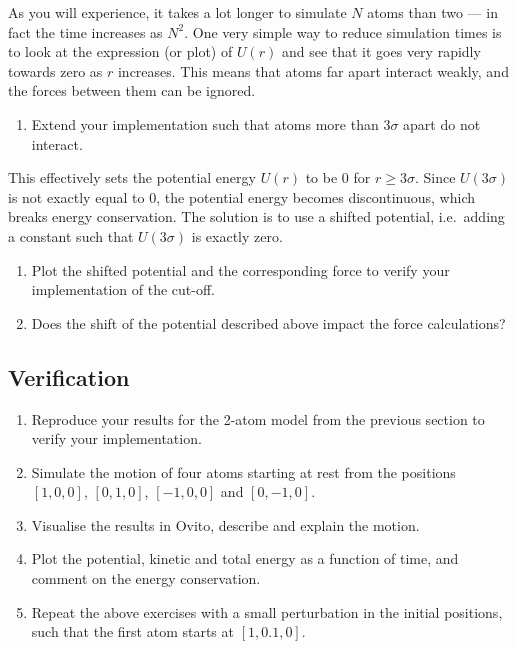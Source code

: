 \documentclass[11pt,english,a4paper]{report}
\begin{document}
As you will experience, it takes a lot longer to simulate \(N\) atoms than two --- in fact the time increases as \(N^2\). One very simple way to reduce simulation times is to look at the expression (or plot) of \(U(r)\) and see that it goes very rapidly towards zero as \(r\) increases. This means that atoms far apart interact weakly, and the forces between them can be ignored.

\begin{enumerate}[label=\roman*., resume]
    \item Extend your implementation such that atoms more than \(3\sigma\) apart do not interact.
\end{enumerate}

This effectively sets the potential energy \(U(r)\) to be \(0\) for \(r\geq 3\sigma\). Since \(U(3\sigma)\) is not exactly equal to \(0\), the potential energy becomes discontinuous, which breaks energy conservation. The solution is to use a shifted potential, i.e.\ adding a constant such that \(U(3\sigma)\) is exactly zero.

\begin{enumerate}[label=\roman*., resume]
    \item Plot the shifted potential and the corresponding force to verify your implementation of the cut-off.
    \item Does the shift of the potential described above impact the force calculations?
\end{enumerate}

\subsection{Verification}
\begin{enumerate}[label=\roman*.]
     \item Reproduce your results for the 2-atom model from the previous section to verify your implementation.
    \item Simulate the motion of four atoms starting at rest from the positions \([1,0,0]\), \([0,1,0]\), \([-1,0,0]\) and \([0,-1,0]\).
    \item Visualise the results in Ovito, describe and explain the motion.
    \item Plot the potential, kinetic and total energy as a function of time, and comment on the energy conservation.
    \item Repeat the above exercises with a small perturbation in the initial positions, such that the first atom starts at \([1,0.1,0]\).
\end{enumerate}
\end{document}

